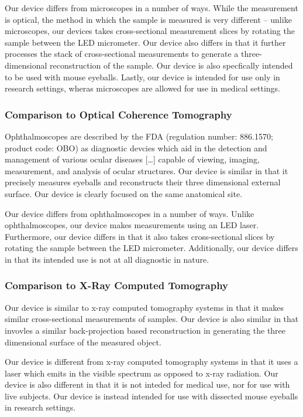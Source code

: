\documentclass{article}
\begin{document}
Our device differs from microscopes in a number of ways. While the
measurement is optical, the method in which the sample is measured is
very different -- unlike microscopes, our devices takes
cross-sectional measurement slices by rotating the sample between the
LED micrometer. Our device also differs in that it further processes
the stack of cross-sectional measurements to generate a
three-dimensional reconstruction of the sample. Our device is also
specfically intended to be used with mouse eyeballs. Lastly, our
device is intended for use only in research settings, wheras
microscopes are allowed for use in medical settings.

\subsubsection{Comparison to Optical Coherence Tomography}
Ophthalmoscopes are described by the FDA (regulation number: 886.1570;
product code: OBO) as diagnostic devcies which aid in the detection
and management of various ocular diseases [\ldots] capable of viewing,
imaging, measurement, and analysis of ocular structures. Our device is
similar in that it precisely measures eyeballs and reconstructs their
three dimensional external surface. Our device is clearly focused on
the same anatomical site.

Our device differs from ophthalmoscopes in a number of ways. Unlike
ophthalmoscopes, our device makes measurements using an LED
laser. Furthermore, our device differs in that it also takes
cross-sectional slices by rotating the sample between the LED
micrometer. Additionally, our device differs in that its intended use
is not at all diagnostic in nature. 

\subsubsection{Comparison to X-Ray Computed Tomography}
Our device is similar to x-ray computed tomography systems in that it
makes similar cross-sectional measurements of samples. Our device is
also similar in that invovles a similar back-projection based
reconstruction in generating the three dimensional surface of the
measured object. 

Our device is different from x-ray computed tomography systems in that
it uses a laser which emits in the visible spectrum as opposed to
x-ray radiation. Our device is also different in that it is not
inteded for medical use, nor for use with live subjects. Our device is
instead intended for use with dissected mouse eyeballs in research
settings.
\end{document}
